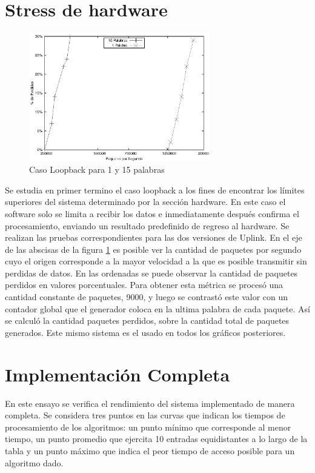 \newpage
\section{Stress de hardware}
\begin{figure}[h]
  \centering
	\includegraphics[width=0.70\textwidth]{5-resultados/graf/loop.eps}
  \caption{Caso Loopback para 1 y 15 palabras}
  \label{fig:loop}
\end{figure}
Se estudia en primer termino el caso loopback a los fines de encontrar los límites superiores del sistema determinado por la sección hardware. En este caso el software solo se limita a recibir los datos e inmediatamente después confirma el procesamiento, enviando un resultado predefinido de regreso al hardware. Se realizan las pruebas correspondientes para las dos versiones de Uplink.
En el eje de las abscisas de la figura \ref{fig:loop} es posible ver la cantidad de paquetes por segundo cuyo el origen corresponde a la mayor velocidad a la que es posible transmitir sin perdidas de datos. En las ordenadas se puede observar la cantidad de paquetes perdidos en valores porcentuales. Para obtener esta métrica se procesó una cantidad constante de paquetes, 9000, y luego se contrastó este valor con un contador global que el generador coloca en la ultima palabra de cada paquete. Así se calculó la cantidad paquetes perdidos, sobre la cantidad total de paquetes generados. Este mismo sistema es el usado en todos los gráficos posteriores.


\newpage
\section{Implementación Completa}

En este ensayo se verifica el rendimiento del sistema implementado de manera completa. Se considera tres puntos en las curvas que indican los tiempos de procesamiento de los algoritmos: un punto mínimo que corresponde al menor tiempo, un punto promedio que ejercita 10 entradas equidistantes a lo largo de la tabla y un punto máximo que indica el peor tiempo de acceso posible para un algoritmo dado. 

